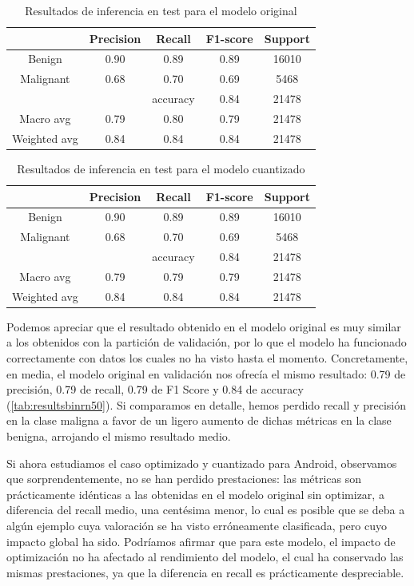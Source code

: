\begin{table}[!ht]
	\centering
	\begin{tabular}{|c|c|c|c|c|}
		\hline
		~ & Precision & Recall & F1-score & Support \\ \hline
		Benign & 0.90 & 0.89 & 0.89 & 16010 \\ 
		Malignant & 0.68 & 0.70 & 0.69 & 5468 \\ \hline
		~ & ~ & accuracy & 0.84 & 21478 \\ \hline
		Macro avg & 0.79 & 0.80 & 0.79 & 21478 \\ 
		Weighted avg & 0.84 & 0.84 & 0.84 & 21478 \\ \hline
	\end{tabular}
	\caption{Resultados de inferencia en test para el modelo original}
	\label{tab:bintestorig}
\end{table}



\begin{table}[!ht]
	\centering
	\begin{tabular}{|c|c|c|c|c|}
		\hline
		~ & Precision & Recall & F1-score & Support \\ \hline
		Benign & 0.90 & 0.89 & 0.89 & 16010 \\ 
		Malignant & 0.68 & 0.70 & 0.69 & 5468 \\ \hline
		~ & ~ & accuracy & 0.84 & 21478 \\ \hline
		Macro avg & 0.79 & 0.79 & 0.79 & 21478 \\ 
		Weighted avg & 0.84 & 0.84 & 0.84 & 21478 \\ \hline
	\end{tabular}
	\caption{Resultados de inferencia en test para el modelo cuantizado}
	\label{tab:bintestquant}
\end{table}

Podemos apreciar que el resultado obtenido en el modelo original es muy similar a los obtenidos con la partición de validación, por lo que el modelo ha funcionado correctamente con datos los cuales no ha visto hasta el momento. Concretamente, en media, el modelo original en validación nos ofrecía el mismo resultado:  0.79 de precisión, 0.79 de recall,  0.79  de F1 Score y 0.84 de accuracy (\ref{tab:resultsbinrn50}). Si comparamos en detalle, hemos perdido recall y precisión en la clase maligna a favor de un ligero aumento de dichas métricas en la clase benigna, arrojando el mismo resultado medio. 

Si ahora estudiamos el caso optimizado y cuantizado para Android, observamos que sorprendentemente, no se han perdido prestaciones: las métricas son prácticamente idénticas a las obtenidas en el modelo original sin optimizar, a diferencia del recall medio, una centésima menor, lo cual es posible que se deba a algún ejemplo cuya valoración se ha visto erróneamente clasificada, pero cuyo impacto global ha sido. Podríamos afirmar que para este modelo, el impacto de optimización no ha afectado al rendimiento del modelo, el cual ha conservado las mismas prestaciones, ya que la diferencia en recall es prácticamente despreciable.

